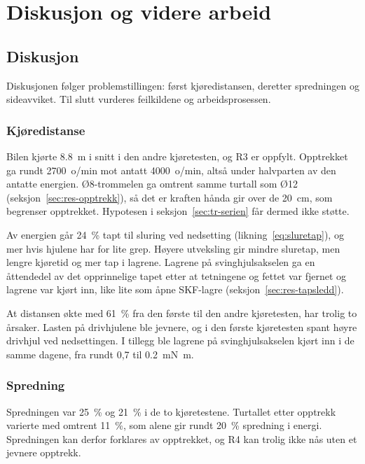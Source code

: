 \section{Diskusjon og videre arbeid}
\label{sec:diskusjon}
\subsection{Diskusjon}
Diskusjonen følger problemstillingen: først kjøredistansen, deretter spredningen og sideavviket. Til slutt vurderes feilkildene og arbeidsprosessen.

\subsubsection{Kjøredistanse}
\label{sec:disk-lager}
\label{sec:disk-tapsledd}
\label{sec:disk-trommel}
Bilen kjørte \SI{8,8}{m} i snitt i den andre kjøretesten, og R3 er oppfylt. Opptrekket ga rundt \SI{2700}{o/min} mot antatt \SI{4000}{o/min}, altså under halvparten av den antatte energien. Ø8-trommelen ga omtrent samme turtall som Ø12 (seksjon~\ref{sec:res-opptrekk}), så det er kraften hånda gir over de \SI{20}{cm}, som begrenser opptrekket. Hypotesen i seksjon~\ref{sec:tr-serien} får dermed ikke støtte.

Av energien går \SI{24}{\percent} tapt til sluring ved nedsetting (likning~\eqref{eq:sluretap}), og mer hvis hjulene har for lite grep. Høyere utveksling gir mindre sluretap, men lengre kjøretid og mer tap i lagrene. Lagrene på svinghjulsakselen ga en åttendedel av det opprinnelige tapet etter at tetningene og fettet var fjernet og lagrene var kjørt inn, like lite som åpne SKF-lagre (seksjon~\ref{sec:res-tapsledd}).

At distansen økte med \SI{61}{\percent} fra den første til den andre kjøretesten, har trolig to årsaker. Lasten på drivhjulene ble jevnere, og i den første kjøretesten spant høyre drivhjul ved nedsettingen. I tillegg ble lagrene på svinghjulsakselen kjørt inn i de samme dagene, fra rundt 0,7 til \SI{0,2}{mN.m}.

\subsubsection{Spredning}
\label{sec:disk-spredning}
Spredningen var \SI{25}{\percent} og \SI{21}{\percent} i de to kjøretestene. Turtallet etter opptrekk varierte med omtrent \SI{11}{\percent}, som alene gir rundt \SI{20}{\percent} spredning i energi. Spredningen kan derfor forklares av opptrekket, og R4 kan trolig ikke nås uten et jevnere opptrekk.


